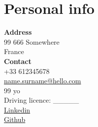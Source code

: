 \section{Personal info}

\textbf{Address}\\
99 666 Somewhere\\
France\\
    
\textbf{Contact}\\
+33 612345678\\
\href{mailto:name.surname@hello.com}{name.surname@hello.com}\\

99 yo\\
Driving licence: \_\_\_\_\_ \\

\href{https://www.linkedin.com/}{Linkedin}\\
\href{https://github.com/}{Github}
